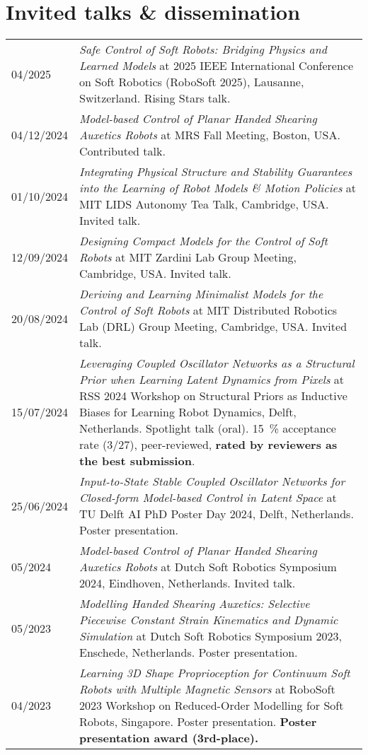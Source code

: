 \section*{Invited talks \& dissemination}
\noindent
\begin{longtable}{p{} p{}}
    04/2025 & \emph{Safe Control of Soft Robots: Bridging Physics and Learned Models} at 2025 IEEE International Conference on Soft Robotics (RoboSoft 2025), Lausanne, Switzerland. Rising Stars talk.\\
    04/12/2024 & \emph{Model-based Control of Planar Handed Shearing Auxetics Robots} at MRS Fall Meeting, Boston, USA. Contributed talk.\\
    01/10/2024 & \emph{Integrating Physical Structure and Stability Guarantees into the Learning of Robot Models \& Motion Policies} at MIT LIDS Autonomy Tea Talk, Cambridge, USA. Invited talk.\\
    12/09/2024 & \emph{Designing Compact Models for the Control of Soft Robots} at MIT Zardini Lab Group Meeting, Cambridge, USA. Invited talk.\\
    20/08/2024 & \emph{Deriving and Learning Minimalist Models for the Control of Soft Robots} at MIT Distributed Robotics Lab (DRL) Group Meeting, Cambridge, USA. Invited talk.\\
    15/07/2024 & \emph{Leveraging Coupled Oscillator Networks as a Structural Prior when Learning Latent Dynamics from Pixels} at RSS 2024 Workshop on Structural Priors as Inductive Biases for
    Learning Robot Dynamics, Delft, Netherlands. Spotlight talk (oral). \SI{15}{\percent} acceptance rate (3/27), peer-reviewed, \textbf{rated by reviewers as the best submission}.\\
    25/06/2024 & \emph{Input-to-State Stable Coupled Oscillator Networks for Closed-form Model-based Control in Latent Space} at TU Delft AI PhD Poster Day 2024, Delft, Netherlands. Poster presentation.\\
    05/2024 & \emph{Model-based Control of Planar Handed Shearing Auxetics Robots} at Dutch Soft Robotics Symposium 2024, Eindhoven, Netherlands. Invited talk.\\
    05/2023 & \emph{Modelling Handed Shearing Auxetics: Selective Piecewise Constant Strain Kinematics and Dynamic Simulation} at Dutch Soft Robotics Symposium 2023, Enschede, Netherlands. Poster presentation.\\
    04/2023 & \emph{Learning 3D Shape Proprioception for Continuum Soft Robots with Multiple Magnetic Sensors} at RoboSoft 2023 Workshop on Reduced-Order Modelling for Soft Robots, Singapore. Poster presentation. \textbf{Poster presentation award (3rd-place).}\\

\end{longtable}
